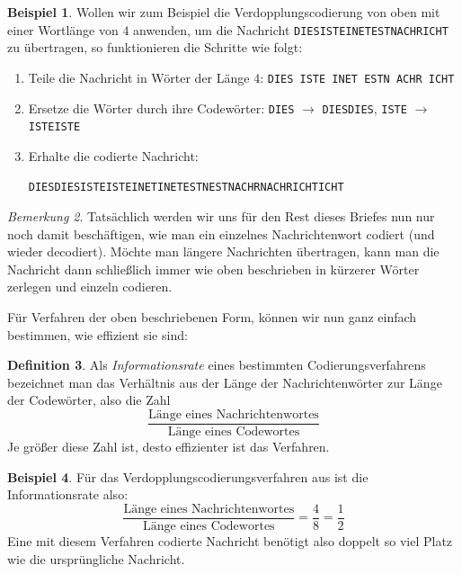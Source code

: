 \documentclass[a4paper,ngerman,12pt]{scrartcl}
\theoremstyle{definition}
\newtheorem{defn}{Definition}[]
\newtheorem{bsp}[defn]{Beispiel}
\theoremstyle{plain}
\theoremstyle{remark}
\newtheorem{bem}[defn]{Bemerkung}
\begin{document}
\begin{bsp}\label{bsp:Verdopplungscodierung}
	Wollen wir zum Beispiel die Verdopplungscodierung von oben mit einer Wortlänge von $4$ anwenden, um die Nachricht \texttt{DIESISTEINETESTNACHRICHT} zu übertragen, so funktionieren die Schritte wie folgt:
	\begin{enumerate}
		\item Teile die Nachricht in Wörter der Länge $4$: \texttt{DIES ISTE INET ESTN ACHR ICHT}
		\item Ersetze die Wörter durch ihre Codewörter: \texttt{DIES} $\rightarrow$ \texttt{DIESDIES}, \texttt{ISTE} $\rightarrow$ \texttt{ISTEISTE}
		\item Erhalte die codierte Nachricht:	
		 \begin{center}
		 	\texttt{DIESDIESISTEISTEINETINETESTNESTNACHRNACHRICHTICHT}
		 \end{center}
	\end{enumerate}
\end{bsp}

\begin{bem}
	Tatsächlich werden wir uns für den Rest dieses Briefes nun nur noch damit beschäftigen, wie man ein einzelnes Nachrichtenwort codiert (und wieder decodiert). Möchte man längere Nachrichten übertragen, kann man die Nachricht dann schließlich immer wie oben beschrieben in kürzerer Wörter zerlegen und einzeln codieren.
\end{bem}

Für Verfahren der oben beschriebenen Form, können wir nun ganz einfach bestimmen, wie effizient sie sind:

\begin{defn}
	Als \emph{Informationsrate} eines bestimmten Codierungsverfahrens bezeichnet man das Verhältnis aus der Länge der Nachrichtenwörter zur Länge der Codewörter, also die Zahl
		\[\frac{\text{Länge eines Nachrichtenwortes}}{\text{Länge eines Codewortes}}\]
	Je größer diese Zahl ist, desto effizienter ist das Verfahren.
\end{defn}

\begin{bsp}
	Für das Verdopplungscodierungsverfahren aus  ist die Informationsrate also:
		\[\frac{\text{Länge eines Nachrichtenwortes}}{\text{Länge eines Codewortes}} = \frac{4}{8} = \frac{1}{2}\]
	Eine mit diesem Verfahren codierte Nachricht benötigt also doppelt so viel Platz wie die ursprüngliche Nachricht.
\end{bsp}
\end{document}
